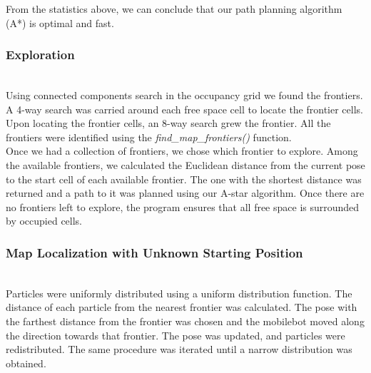 \documentclass[journal]{IEEEtran}
\begin{document}
From the statistics above, we can conclude that our path planning algorithm (A*) is optimal and fast.\\


\subsubsection{Exploration} \hfill\\

Using connected components search in the occupancy grid we found the frontiers. A 4-way search was carried around each free space cell to locate the frontier cells. Upon locating the frontier cells, an 8-way search grew the frontier. All the frontiers were identified using the \textit{find\_map\_frontiers()} function.\\

Once we had a collection of frontiers, we chose which frontier to explore. Among the available frontiers, we calculated the Euclidean distance from the current pose to the start cell of each available frontier. The one with the shortest distance was returned and a path to it was planned using our A-star algorithm. Once there are no frontiers left to explore, the program ensures that all free space is surrounded by occupied cells.\\

\subsubsection{Map Localization with Unknown Starting Position}  \hfill\\
\indent Particles were uniformly distributed using a uniform distribution function. The distance of each particle from the nearest frontier was calculated. The pose with the farthest distance from the frontier was chosen and the mobilebot moved along the direction towards that frontier. The pose was updated, and particles were redistributed. The same procedure was iterated until a narrow distribution was obtained.\\


\ifCLASSOPTIONcaptionsoff
  \newpage
\fi

\nocite{*}


\end{document}
